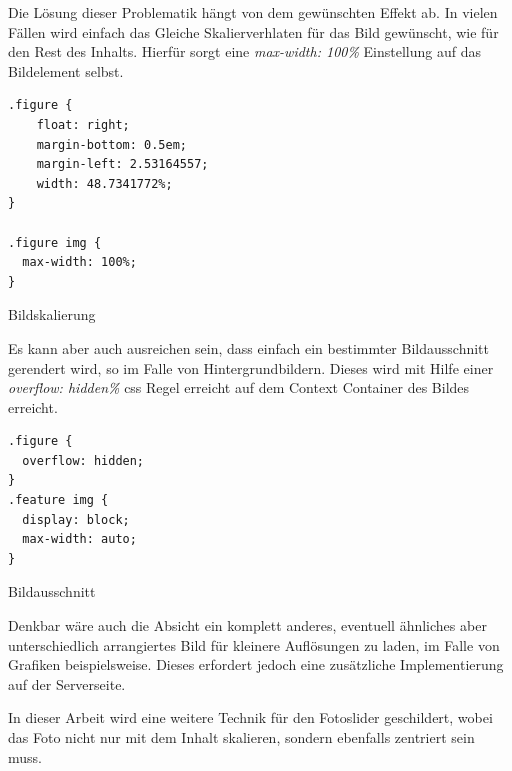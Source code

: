 Die Lösung dieser Problematik hängt von dem gewünschten Effekt ab. In vielen Fällen wird einfach das Gleiche Skalierverhlaten für das Bild gewünscht, wie für den Rest des Inhalts. Hierfür sorgt eine \emph{max-width: 100\%} Einstellung auf das Bildelement selbst. 

\begin{listing}[H]
\begin{verbatim}
.figure {
    float: right;
    margin-bottom: 0.5em;
    margin-left: 2.53164557;
    width: 48.7341772%;
}

.figure img {
  max-width: 100%;
}
\end{verbatim}
\caption{Bildskalierung}
\label{lst:scalable_image}
\end{listing}


Es kann aber auch ausreichen sein, dass einfach ein bestimmter Bildausschnitt gerendert wird, so im Falle von Hintergrundbildern. Dieses wird mit Hilfe einer \emph{overflow: hidden\%} css Regel erreicht auf dem Context Container des Bildes erreicht. 

\begin{listing}[H]
\begin{verbatim}
.figure {
  overflow: hidden;
}
.feature img {
  display: block;
  max-width: auto;
}
\end{verbatim}
\caption{Bildausschnitt}
\label{lst:cropped_image}
\end{listing}

Denkbar wäre auch die Absicht ein komplett anderes, eventuell ähnliches aber unterschiedlich arrangiertes Bild für kleinere Auflösungen zu laden, im Falle von Grafiken beispielsweise. Dieses erfordert jedoch eine zusätzliche Implementierung auf der Serverseite.

In dieser Arbeit wird eine weitere Technik für den Fotoslider geschildert, wobei das Foto nicht nur mit dem Inhalt skalieren, sondern ebenfalls zentriert sein muss.


